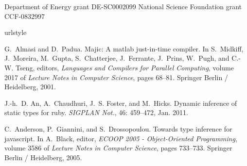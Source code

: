 \documentclass[9pt]{sigplanconf}
\begin{document}




\acks
Department of Energy grant DE-SC0002099
National Science Foundation grant CCF-0832997




%

\begin{thebibliography}{42}
\softraggedright

\providecommand{\natexlab}[1]{#1}
\providecommand{\url}[1]{\texttt{#1}}
\expandafter\ifx\csname urlstyle\endcsname\relax
  \providecommand{\doi}[1]{doi: #1}\else
  \providecommand{\doi}{doi: \begingroup \urlstyle{rm}\Url}\fi

G.~Almasi and D.~Padua.
\newblock Majic: A matlab just-in-time compiler.
\newblock In S.~Midkiff, J.~Moreira, M.~Gupta, S.~Chatterjee, J.~Ferrante,
  J.~Prins, W.~Pugh, and C.-W. Tseng, editors, \emph{Languages and Compilers
  for Parallel Computing}, volume 2017 of \emph{Lecture Notes in Computer
  Science}, pages 68--81. Springer Berlin / Heidelberg, 2001.

J.-h.~D. An, A.~Chaudhuri, J.~S. Foster, and M.~Hicks.
\newblock Dynamic inference of static types for ruby.
\newblock \emph{SIGPLAN Not.}, 46: 459--472, Jan. 2011.

C.~Anderson, P.~Giannini, and S.~Drossopoulou.
\newblock Towards type inference for javascript.
\newblock In A.~Black, editor, \emph{ECOOP 2005 - Object-Oriented Programming},
  volume 3586 of \emph{Lecture Notes in Computer Science}, pages 733--733.
  Springer Berlin / Heidelberg, 2005.


\end{thebibliography}
\end{document}
